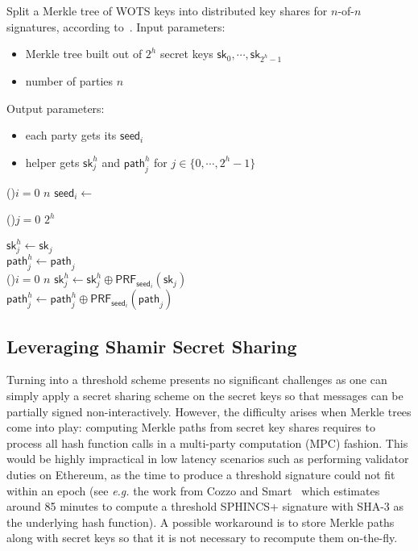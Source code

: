 \begin{myalgorithm}{Split a Merkle tree of WOTS keys into distributed key shares for $n$-of-$n$ signatures, according to~\cite{cryptoeprint:2022/241}.}
Input parameters:
\begin{itemize}
\itemsep-.5em
\item Merkle tree built out of $2^h$ \WOTS secret keys $\mathsf{sk}_0,\cdots,\mathsf{sk}_{2^h-1}$
\item number of parties $n$
\end{itemize}
Output parameters:
\vspace{-.75em}
\begin{itemize}
\itemsep-.5em
\item each party gets its $\mathsf{seed}_i$
\item helper gets $\mathsf{sk}^h_{j}$ and $\mathsf{path}^h_{j}$ for $j \in \{0,\cdots,2^h-1\}$
\end{itemize}

\For(){$i=0$ \KwTo $n$} {
	$\mathsf{seed}_i \leftarrow $ 
}

\For(){$j=0$ \KwTo $2^h$} {
	$\mathsf{sk}^h_j \leftarrow \mathsf{sk}_j$ \\
	$\mathsf{path}^h_j \leftarrow \mathsf{path}_j$ \\
	\For(){$i=0$ \KwTo $n$} {
		$\mathsf{sk}^h_j \leftarrow \mathsf{sk}^h_j \oplus \mathsf{PRF}_{\mathsf{seed}_i}(\mathsf{sk}_j)$\\
		$\mathsf{path}^h_j \leftarrow \mathsf{path}^h_j \oplus \mathsf{PRF}_{\mathsf{seed}_i}(\mathsf{path}_j)$\\
	}

}
\label{alg:bool_split_n}
\end{myalgorithm}

\subsection{Leveraging Shamir Secret Sharing}
Turning \WOTS into a threshold scheme presents no significant challenges as one can simply apply a secret sharing scheme on the secret keys so that messages can be partially signed non-interactively.
However, the difficulty arises when Merkle trees come into play: computing Merkle paths from secret key shares requires to process all hash function calls in a multi-party computation (MPC) fashion.
This would be highly impractical in low latency scenarios such as performing validator duties on Ethereum, as the time to produce a threshold signature could not fit within an epoch (see \textit{e.g.} the work from Cozzo and Smart~\cite{cryptoeprint:2019/1060} which estimates around 85 minutes to compute a threshold \textsf{SPHINCS+} signature with \textsf{SHA-3} as the underlying hash function).
A possible workaround is to store Merkle paths along with \WOTS secret keys so that it is not necessary to recompute them on-the-fly.



